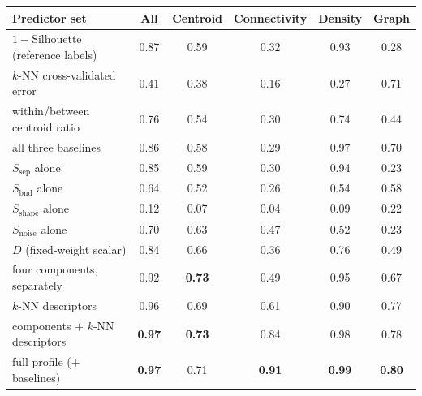 \begin{tabular}{@{}lccccc@{}}
\toprule
Predictor set & All & Centroid & Connectivity & Density & Graph \\
\midrule
$1-$Silhouette (reference labels) & 0.87 & 0.59 & 0.32 & 0.93 & 0.28 \\
$k$-NN cross-validated error & 0.41 & 0.38 & 0.16 & 0.27 & 0.71 \\
within/between centroid ratio & 0.76 & 0.54 & 0.30 & 0.74 & 0.44 \\
all three baselines & 0.86 & 0.58 & 0.29 & 0.97 & 0.70 \\
\midrule
$S_{\text{sep}}$ alone & 0.85 & 0.59 & 0.30 & 0.94 & 0.23 \\
$S_{\text{bnd}}$ alone & 0.64 & 0.52 & 0.26 & 0.54 & 0.58 \\
$S_{\text{shape}}$ alone & 0.12 & 0.07 & 0.04 & 0.09 & 0.22 \\
$S_{\text{noise}}$ alone & 0.70 & 0.63 & 0.47 & 0.52 & 0.23 \\
$D$ (fixed-weight scalar) & 0.84 & 0.66 & 0.36 & 0.76 & 0.49 \\
\midrule
four components, separately & 0.92 & \textbf{0.73} & 0.49 & 0.95 & 0.67 \\
$k$-NN descriptors & 0.96 & 0.69 & 0.61 & 0.90 & 0.77 \\
components $+$ $k$-NN descriptors & \textbf{0.97} & \textbf{0.73} & 0.84 & 0.98 & 0.78 \\
full profile ($+$ baselines) & \textbf{0.97} & 0.71 & \textbf{0.91} & \textbf{0.99} & \textbf{0.80} \\
\bottomrule
\end{tabular}
